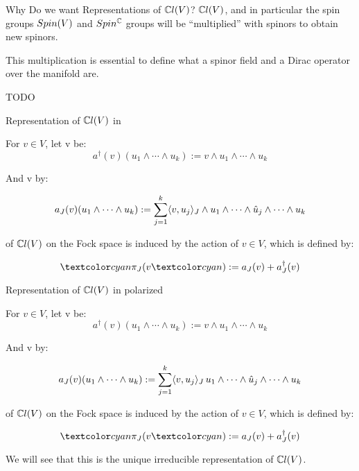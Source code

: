 \begin{frame}{Why Do we want Representations of $\mathbb C l(V)$?}
    $\mathbb C l(V)$, and in particular the spin groups $Spin(V)$ and $Spin^\mathbb C$ groups will be ``multiplied'' with spinors to obtain new spinors. 
    
    This multiplication is essential to define what a spinor field and a Dirac operator over the manifold are.
    
    TODO
\end{frame}

\begin{frame}{Representation of $\mathbb C l(V)$ in \fjv} %
    
    For $v \in V$, let v be:
    \[ a^\dagger(v) (u_1 \wedge \cdots \wedge u_k) := v \wedge u_1 \wedge \cdots \wedge u_k \]
    
    And v by:
    
    \[ a_J(v) (u_1 \wedge \cdots \wedge u_k) := \sum_{j = 1}^k \langle v, u_j \rangle_J \wedge u_1 \wedge \cdots \wedge \hat u_j \wedge \cdots  \wedge u_k \]
    
     of $\mathbb C l(V)$ on the Fock space is induced by the action of $v \in V$, which is defined by:
    
    \[ \defn{\pi_J(}v\defn{)} := a_J(v) + a_J^\dagger(v) \]

\end{frame}

\begin{frame}{Representation of $\mathbb C l(V)$ in polarized \fjv} %
    
    For $v \in V$, let v be:
    \[ a^\dagger(v) (u_1 \wedge \cdots \wedge u_k) := v \wedge u_1 \wedge \cdots \wedge u_k \]
    
    And v by:
    
    \[ a_J(v) (u_1 \wedge \cdots \wedge u_k) := \sum_{j = 1}^k \langle v, u_j \rangle_J\, u_1 \wedge \cdots \wedge \hat u_j \wedge \cdots  \wedge u_k \]
    
     of $\mathbb C l(V)$ on the Fock space is induced by the action of $v \in V$, which is defined by:
    
    \[ \defn{\pi_J(}v\defn{)} := a_J(v) + a_J^\dagger(v) \]
    
    We will see that this is the unique irreducible representation of $\mathbb C l(V)$.
    
\end{frame}

